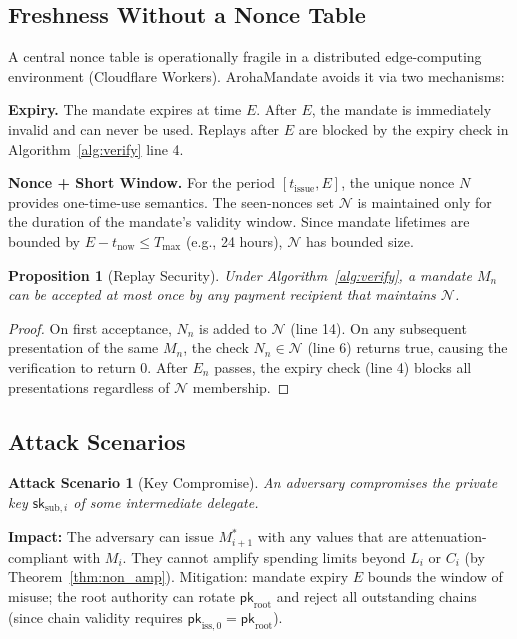 \documentclass[conference]{IEEEtran}
\newtheorem{proposition}[theorem]{Proposition}
\newtheorem{attack}{Attack Scenario}
\newcommand{\pk}{\mathsf{pk}}
\newcommand{\sk}{\mathsf{sk}}
\begin{document}
\subsection{Freshness Without a Nonce Table}

A central nonce table is operationally fragile in a
distributed edge-computing environment (Cloudflare Workers).
ArohaMandate avoids it via two mechanisms:

\textbf{Expiry.} The mandate expires at time $E$.  After
$E$, the mandate is immediately invalid and can never be
used. Replays after $E$ are blocked by the expiry check
in Algorithm~\ref{alg:verify} line 4.

\textbf{Nonce + Short Window.} For the period $[t_{\text{issue}},
E]$, the unique nonce $N$ provides one-time-use semantics.
The seen-nonces set $\mathcal{N}$ is maintained only for the
duration of the mandate's validity window. Since mandate
lifetimes are bounded by $E - t_{\text{now}} \leq T_{\max}$
(e.g., 24 hours), $\mathcal{N}$ has bounded size.

\begin{proposition}[Replay Security]
\label{prop:replay}
Under Algorithm~\ref{alg:verify}, a mandate $M_n$ can be
accepted at most once by any payment recipient that
maintains $\mathcal{N}$.
\end{proposition}
\begin{proof}
On first acceptance, $N_n$ is added to $\mathcal{N}$
(line 14). On any subsequent presentation of the same
$M_n$, the check $N_n \in \mathcal{N}$ (line 6) returns
true, causing the verification to return 0. After $E_n$
passes, the expiry check (line 4) blocks all presentations
regardless of $\mathcal{N}$ membership.
\end{proof}

\subsection{Attack Scenarios}

\begin{attack}[Key Compromise]
\label{attack:key}
An adversary compromises the private key $\sk_{\text{sub},i}$
of some intermediate delegate.
\end{attack}
\textbf{Impact:} The adversary can issue $M_{i+1}^*$ with
any values that are attenuation-compliant with $M_i$.  They
cannot amplify spending limits beyond $L_i$ or $C_i$ (by
Theorem~\ref{thm:non_amp}). Mitigation: mandate expiry $E$
bounds the window of misuse; the root authority can rotate
$\pk_{\text{root}}$ and reject all outstanding chains (since
chain validity requires $\pk_{\text{iss},0} = \pk_{\text{root}}$).
\end{document}
